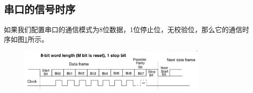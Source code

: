 \subsection{串口的信号时序}
如果我们配置串口的通信模式为8位数据，1位停止位，无校验位，那么它的通信时序如图\ref{fig:usartTime}所示。
\begin{figure}[h]
	\begin{center}
		\includegraphics[width=0.85\textwidth]{images/content/usartTime.png}
		\label{fig:usartTime}
	\end{center}
\end{figure}

















